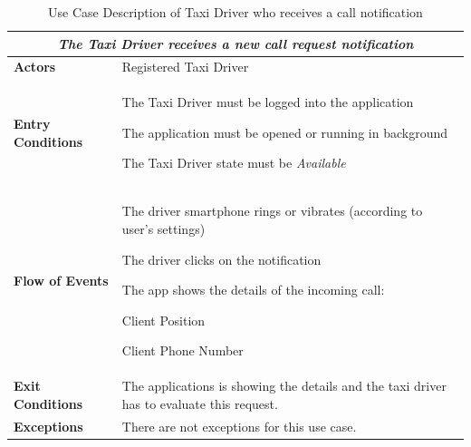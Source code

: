 \documentclass[a4paper]{article}
\begin{document}
\begin{table} [H]
\begin{center}
\begin{tabular}{ |m{}|m{}|  }
\hline
    \multicolumn{2}{|c|}{\textbf{\textit{The Taxi Driver receives a new call request notification}}} \\
\hline \hline
    \textbf{Actors}
&   Registered Taxi Driver
\\ \hline
    \textbf{Entry Conditions}
&   
    \begin{itemize*}
    \item The Taxi Driver must be logged into the application
    \item The application must be opened or running in background
    \item The Taxi Driver state must be \emph{Available}
    \end{itemize*}
\\ \hline
    \textbf{Flow of Events}
& 
    \begin{enumerate*}
    \item The driver smartphone rings or vibrates (according to user's settings)
    \item The driver clicks on the notification
    \item The app shows the details of the incoming call:
        \begin{itemize*}
        \item Client Position
        \item Client Phone Number
        \end{itemize*}
    \end{enumerate*}
\\ \hline
    \textbf{Exit Conditions}
&  The applications is showing the details and the taxi driver has to evaluate this request.
\\ \hline
    \textbf{Exceptions}
&   There are not exceptions for this use case.
\\ \hline
\end{tabular}
\end{center}
\caption{Use Case Description of Taxi Driver who receives a call notification}
\label{table:taxireceivenotification}
\end{table}
\end{document}
